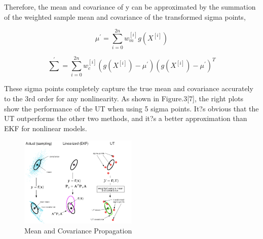 \documentclass[10pt,twocolumn,letterpaper]{article}
\begin{document}
Therefore, the mean and covariance of y can be approximated by the summation of the weighted sample mean and covariance of the transformed sigma points,

\begin{equation}
\mu^{'}=\sum_{i=0}^{2n}w_m^{[i]}g(X^{[i]})
\end{equation}

\begin{equation}
\sum^{'}=\sum_{i=0}^{2n}w_c^{[i]}(g(X^{[i]})-\mu^{'})(g(X^{[i]})-\mu^{'})^T
\end{equation}

These sigma points completely capture the true mean and covariance accurately to the 3rd order for any nonlinearity. As shown in Figure.3[7], the right plots show the performance of the UT when using 5 sigma points. It?s obvious that the UT outperforms the other two methods, and it?s a better approximation than EKF for nonlinear models.

\begin{figure}
     \centering
       \includegraphics[width=0.5\textwidth]{pic_3.png}
        \caption{\small{Mean and Covariance Propagation}}
 \end{figure}
\end{document}

